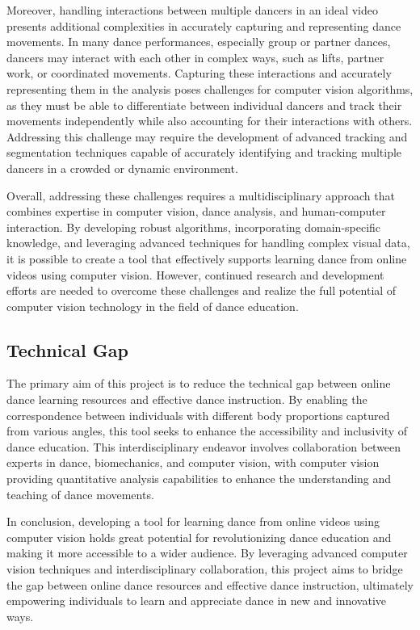 Moreover, handling interactions between multiple dancers in an ideal video presents additional 
complexities in accurately capturing and representing dance movements. In many dance performances, 
especially group or partner dances, dancers may interact with each other in complex ways, such as 
lifts, partner work, or coordinated movements. Capturing these interactions and accurately 
representing them in the analysis poses challenges for computer vision algorithms, as they must be 
able to differentiate between individual dancers and track their movements independently while also 
accounting for their interactions with others. Addressing this challenge may require the development 
of advanced tracking and segmentation techniques capable of accurately identifying and tracking 
multiple dancers in a crowded or dynamic environment.

Overall, addressing these challenges requires a multidisciplinary approach that combines expertise 
in computer vision, dance analysis, and human-computer interaction. By developing robust algorithms, 
incorporating domain-specific knowledge, and leveraging advanced techniques for handling complex 
visual data, it is possible to create a tool that effectively supports learning dance from online 
videos using computer vision. However, continued research and development efforts are needed to 
overcome these challenges and realize the full potential of computer vision technology in the 
field of dance education.\cite{Authors14b}

\subsection{Technical Gap}
The primary aim of this project is to reduce the technical gap between online dance learning resources and 
effective dance instruction. By enabling the correspondence between individuals with different body proportions 
captured from various angles, this tool seeks to enhance the accessibility and inclusivity of dance education. 
This interdisciplinary endeavor involves collaboration between experts in dance, biomechanics, and computer 
vision, with computer vision providing quantitative analysis capabilities to enhance the understanding and 
teaching of dance movements.

In conclusion, developing a tool for learning dance from online videos using computer vision holds 
great potential for revolutionizing dance education and making it more accessible to a wider 
audience. By leveraging advanced computer vision techniques and interdisciplinary collaboration, 
this project aims to bridge the gap between online dance resources and effective dance instruction, 
ultimately empowering individuals to learn and appreciate dance in new and innovative ways.


